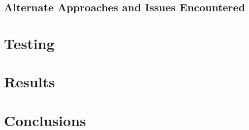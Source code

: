 \documentclass[]{article}
\begin{document}


\subsection{Alternate Approaches and Issues Encountered}

\section{Testing}

\section{Results}

\section{Conclusions}




\end{document}
